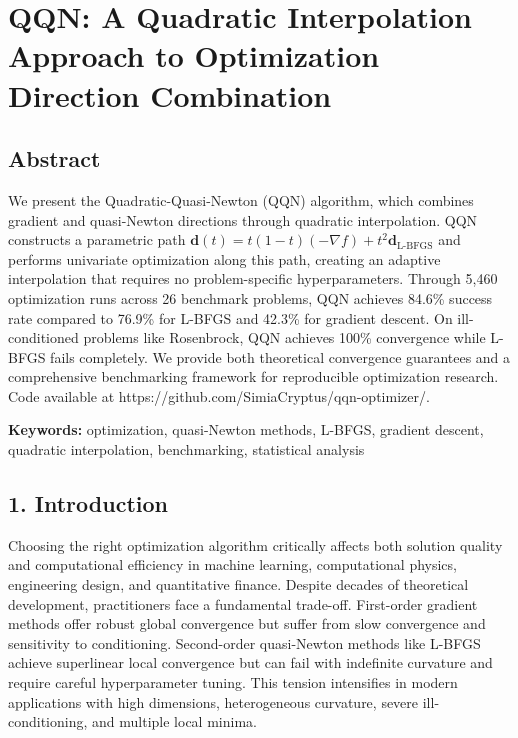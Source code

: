 \hypertarget{qqn-a-quadratic-interpolation-approach-to-optimization-direction-combination}{%
\section{QQN: A Quadratic Interpolation Approach to Optimization Direction Combination}\label{qqn-a-quadratic-interpolation-approach-to-optimization-direction-combination}}

\hypertarget{abstract}{%
\subsection{Abstract}\label{abstract}}

We present the Quadratic-Quasi-Newton (QQN) algorithm, which combines gradient and quasi-Newton directions through quadratic interpolation. QQN constructs a parametric path \(\mathbf{d}(t) = t(1-t)(-\nabla f) + t^2 \mathbf{d}_{\text{L-BFGS}}\) and performs univariate optimization along this path, creating an adaptive interpolation that requires no problem-specific hyperparameters. Through 5,460 optimization runs across 26 benchmark problems, QQN achieves 84.6\% success rate compared to 76.9\% for L-BFGS and 42.3\% for gradient descent. On ill-conditioned problems like Rosenbrock, QQN achieves 100\% convergence while L-BFGS fails completely. We provide both theoretical convergence guarantees and a comprehensive benchmarking framework for reproducible optimization research. Code available at https://github.com/SimiaCryptus/qqn-optimizer/.

\textbf{Keywords:} optimization, quasi-Newton methods, L-BFGS, gradient descent, quadratic interpolation, benchmarking, statistical analysis

\hypertarget{introduction}{%
\subsection{1. Introduction}\label{introduction}}

Choosing the right optimization algorithm critically affects both solution quality and computational efficiency in machine learning, computational physics, engineering design, and quantitative finance.
Despite decades of theoretical development, practitioners face a fundamental trade-off.
First-order gradient methods offer robust global convergence but suffer from slow convergence and sensitivity to conditioning.
Second-order quasi-Newton methods like L-BFGS achieve superlinear local convergence but can fail with indefinite curvature and require careful hyperparameter tuning.
This tension intensifies in modern applications with high dimensions, heterogeneous curvature, severe ill-conditioning, and multiple local minima.

